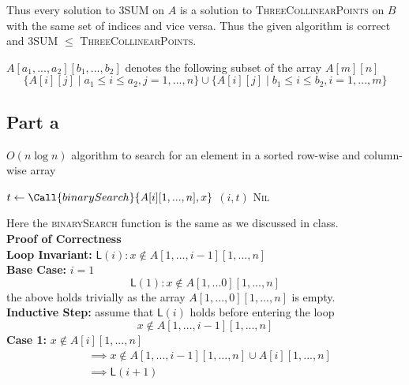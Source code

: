 \documentclass[12pt]{article}
\begin{document}
\begin{solution}
    Thus every solution to \textsc{3SUM} on $A$ is a solution to
    \textsc{ThreeCollinearPoints} on $B$ with the same set of indices and vice
    versa.
    Thus the given algorithm is correct and \textsc{3SUM} $\leq$
    \textsc{ThreeCollinearPoints}.
\end{solution}

\begin{problem}
    
\end{problem}
\begin{notation}
    $A[a_1,..., a_2][b_1,...,b_2]$ denotes the following subset of the array $A[m][n]$
    $$\{A[i][j] \mid a_1 \leq i \leq a_2, j = 1,...,n\} \cup \{A[i][j] \mid b_1 \leq i \leq b_2, i = 1,...,m\}$$
\end{notation}
\subsection*{Part a}
\begin{algorithm}
    \caption{$O(n \log n)$ algorithm to search for an element in a sorted row-wise and column-wise array}
    \begin{algorithmic}[1]
            \State $t \gets \Call{binarySearch}{A[i][1,...,n], x}$
                \State \Return $(i, t)$\;
            \EndIf
        \EndFor
        \State \Return \textsc{Nil}
    \end{algorithmic}
\end{algorithm}
Here the \textsc{binarySearch} function is the same as we discussed in class.\\
\textbf{Proof of Correctness}\\
\textbf{Loop Invariant:} $\mathsf{L}(i): x \notin A[1,...,i-1][1,...,n]$\\
\textbf{Base Case:} $i = 1$\\
$$\mathsf{L}(1): x \notin A[1,...0][1,...,n]$$
the above holds trivially as the array $A[1,...,0][1,...,n]$ is empty.\\
\textbf{Inductive Step:} assume that $\mathsf{L}(i)$ holds before entering the loop\\
$$x \notin A[1,...,i-1][1,...,n]$$
\textbf{Case 1:} $x \notin A[i][1,...,n]$\\
    \begin{align*}
        &\implies x \notin A[1,...,i-1][1,...,n] \cup A[i][1,...,n]\\
        &\implies \mathsf{L}(i+1)\\
    \end{align*}
\end{document}
